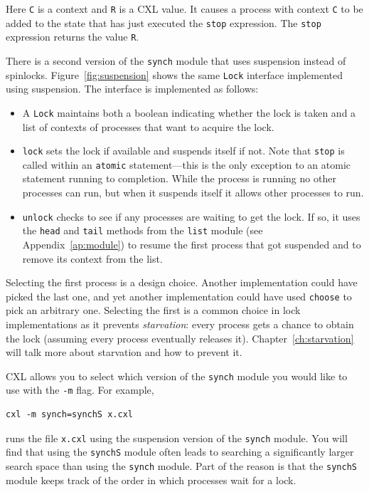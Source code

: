 \documentclass{report}
\newenvironment{code}{
\tcolorbox
}{
\endtcolorbox
}
\begin{document}
Here \texttt{C} is a context and \texttt{R} is a CXL value.
It causes a process with context \texttt{C} to be added to the state that has
just executed the \texttt{stop}
expression.  The \texttt{stop} expression returns the value \texttt{R}.

There is a second version of the \texttt{synch} module that uses suspension
instead of spinlocks.
Figure~\ref{fig:suspension} shows the same \texttt{Lock} interface implemented
using suspension.
The interface is implemented as follows:
\begin{itemize}
\item A \texttt{Lock} maintains both a boolean indicating whether the
lock is taken and a list of contexts of processes that want to acquire the lock.
\item
\texttt{lock}
sets the lock if available and suspends itself if not.
Note that \texttt{stop} is called within an \texttt{atomic} statement---this is
the only exception to an atomic statement running to completion.  While the
process is running no other processes can run, but when it suspends itself
it allows other processes to run.
\item
\texttt{unlock}
checks to see if any processes are waiting to get the lock.
If so, it uses the \texttt{head} and \texttt{tail}
methods from the \texttt{list} module (see Appendix~\ref{ap:module})
to resume the first process that got
suspended and to remove its context from the list.
\end{itemize}
Selecting the first process is a design choice.  Another implementation could
have picked the last one, and yet another implementation could have used
\texttt{choose} to pick an arbitrary one.  Selecting the first is a common
choice in lock implementations as it prevents \emph{starvation}:
every process
gets a chance to obtain the lock (assuming every process eventually releases
it).  Chapter~\ref{ch:starvation} will talk more about starvation and how
to prevent it.

CXL allows you to select which version of the \texttt{synch} module you would
like to use with the \texttt{-m} flag.
For example,

\begin{code}
\begin{verbatim}
cxl -m synch=synchS x.cxl
\end{verbatim}
\end{code}

runs the file \texttt{x.cxl} using the suspension version of the \texttt{synch} module.
You will find that using the \texttt{synchS} module often leads to searching a
significantly larger search space than using the \texttt{synch} module.
Part of the reason is that the \texttt{synchS} module keeps track of the order
in which processes wait for a lock.
\end{document}
